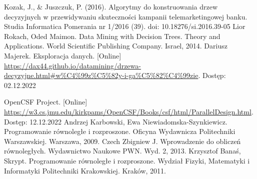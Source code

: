 \documentclass[12pt]{article}
\begin{document}
\newpage

\listoftables
\listoffigures
\lstlistoflistings

\newpage

\begin{thebibliography}{20}

     Kozak, J., \& Juszczuk, P. (2016). Algorytmy do konstruowania drzew decyzyjnych w przewidywaniu skuteczności kampanii telemarketingowej banku. Studia Informatica Pomerania nr 1/2016 (39). doi: 10.18276/si.2016.39-05
     Lior Rokach, Oded Maimon. Data Mining with Decision Trees. Theory and Applications. World Scientific Publishing Company. Israel, 2014.
     Dariusz Majerek. Eksploracja danych. [Online] \url{https://dax44.github.io/datamining/drzewa-decyzyjne.html#w%C4%99z%C5%82y-i-ga%C5%82%C4%99zie}. Dostęp: 02.12.2022
   
     OpenCSF Project. [Online] \url{https://w3.cs.jmu.edu/kirkpams/OpenCSF/Books/csf/html/ParallelDesign.html}. Dostęp: 12.12.2022
     Andrzej Karbowski, Ewa Niewiadomska-Szynkiewicz. Programowanie równoległe i rozproszone. Oficyna Wydawnicza Politechniki Warszawskiej. Warszawa, 2009.
     Czech Zbigniew J. Wprowadzenie do obliczeń równoległych. Wydawnictwo Naukowe PWN. Wyd. 2, 2013.
     Krzysztof Banaś, Skrypt. Programowanie równoległe i rozproszone. Wydział Fizyki, Matematyki i Informatyki Politechniki Krakowskiej. Kraków, 2011.


\end{thebibliography}
\end{document}
